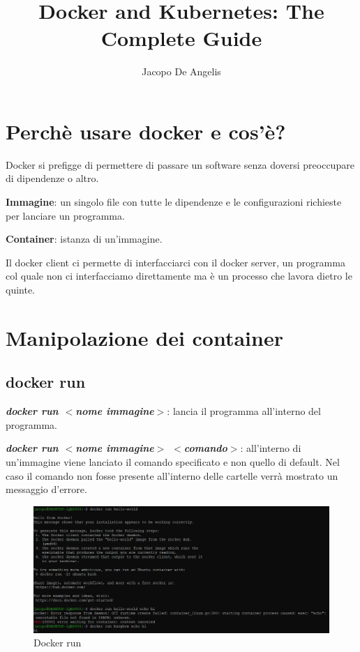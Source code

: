 \documentclass[11pt,a4paper]{book}
\begin{document}
\title{Docker and Kubernetes: The Complete Guide}
\author{Jacopo De Angelis}
\maketitle

\pagebreak
\tableofcontents
\pagebreak

\chapter{Perchè usare docker e cos'è?}
Docker si prefigge di permettere di passare un software senza doversi preoccupare di dipendenze o altro.

\textbf{Immagine}: un singolo file con tutte le dipendenze e le configurazioni richieste per lanciare un programma.

\textbf{Container}: istanza di un'immagine. 

Il docker client ci permette di interfacciarci con il docker server, un programma col quale non ci interfacciamo direttamente ma è un processo che lavora dietro le quinte.

\chapter{Manipolazione dei container}
\section{docker run}
\emph{\textbf{docker run $<$nome immagine$>$}}: lancia il programma all'interno del programma.

\emph{\textbf{docker run $<$nome immagine$>$ $<$comando$>$}}: all'interno di un'immagine viene lanciato il comando specificato e non quello di default. Nel caso il comando non fosse presente all'interno delle cartelle verrà mostrato un messaggio d'errore.

\begin{figure}[h!]
	\begin{center}
		\includegraphics[scale=0.5]{img/002.jpg}
		\caption{Docker run}
		\label{fig: 002}
	\end{center}
\end{figure}
\end{document}
